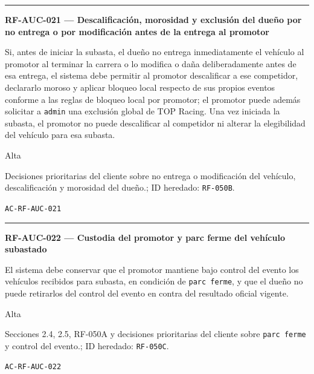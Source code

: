 \documentclass[10pt,letterpaper]{article}
\begin{document}
\vspace{0.25em}\hrule\vspace{0.65em}
\noindent\textbf{RF-AUC-021 --- Descalificación, morosidad y exclusión del dueño por no entrega o por modificación antes de la entrega al promotor}\par
\begin{description}[style=nextline,leftmargin=3.15cm,labelwidth=2.8cm,font=\normalfont\bfseries]
\item[Obligación] Si, antes de iniciar la subasta, el dueño no entrega inmediatamente el vehículo al promotor al terminar la carrera o lo modifica o daña deliberadamente antes de esa entrega, el sistema debe permitir al promotor descalificar a ese competidor, declararlo moroso y aplicar bloqueo local respecto de sus propios eventos conforme a las reglas de bloqueo local por promotor; el promotor puede además solicitar a \texttt{admin} una exclusión global de TOP Racing. Una vez iniciada la subasta, el promotor no puede descalificar al competidor ni alterar la elegibilidad del vehículo para esa subasta.
\item[Prioridad] Alta
\item[Procedencia] Decisiones prioritarias del cliente sobre no entrega o modificación del vehículo, descalificación y morosidad del dueño.; ID heredado: \texttt{RF-050B}.
\item[Verificación] \texttt{AC-RF-AUC-021}
\end{description}
\vspace{0.25em}\hrule\vspace{0.65em}
\noindent\textbf{RF-AUC-022 --- Custodia del promotor y parc ferme del vehículo subastado}\par
\begin{description}[style=nextline,leftmargin=3.15cm,labelwidth=2.8cm,font=\normalfont\bfseries]
\item[Obligación] El sistema debe conservar que el promotor mantiene bajo control del evento los vehículos recibidos para subasta, en condición de \texttt{parc ferme}, y que el dueño no puede retirarlos del control del evento en contra del resultado oficial vigente.
\item[Prioridad] Alta
\item[Procedencia] Secciones 2.4, 2.5, RF-050A y decisiones prioritarias del cliente sobre \texttt{parc ferme} y control del evento.; ID heredado: \texttt{RF-050C}.
\item[Verificación] \texttt{AC-RF-AUC-022}
\end{description}
\end{document}
